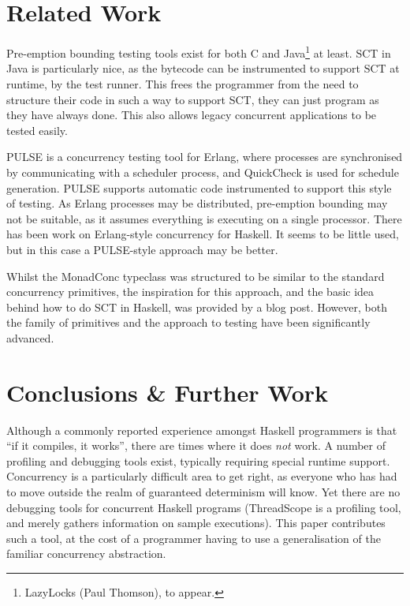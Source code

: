 \section{Related Work}
\label{sec:dejafu-related}

Pre-emption bounding testing tools exist for both C\cite{maple} and
Java\footnote{LazyLocks (Paul Thomson), to appear.} at least. SCT in
Java is particularly nice, as the bytecode can be instrumented to
support SCT at runtime, by the test runner. This frees the programmer
from the need to structure their code in such a way to support SCT,
they can just program as they have always done. This also allows
legacy concurrent applications to be tested easily.

PULSE\cite{pulse} is a concurrency testing tool for Erlang, where
processes are synchronised by communicating with a scheduler process,
and QuickCheck is used for schedule generation.  PULSE supports
automatic code instrumented to support this style of testing. As
Erlang processes may be distributed, pre-emption bounding may not be
suitable, as it assumes everything is executing on a single
processor. There has been work on Erlang-style concurrency for
Haskell\cite{cloudhaskell}. It seems to be little used, but in this
case a PULSE-style approach may be better.

Whilst the MonadConc typeclass was structured to be similar to the
standard concurrency primitives, the inspiration for this approach,
and the basic idea behind how to do SCT in Haskell, was provided by a
blog post\cite{typeclass}. However, both the family of primitives and
the approach to testing have been significantly advanced.

\section{Conclusions \& Further Work}
\label{sec:dejafu-conclusion}

Although a commonly reported experience amongst Haskell programmers is
that ``if it compiles, it works'', there are times where it does
\textit{not} work. A number of profiling and debugging tools exist,
typically requiring special runtime support. Concurrency is a
particularly difficult area to get right, as everyone who has had to
move outside the realm of guaranteed determinism will know. Yet there
are no debugging tools for concurrent Haskell programs
(ThreadScope\cite{threadscope} is a profiling tool, and merely gathers
information on sample executions). This paper contributes such a tool,
at the cost of a programmer having to use a generalisation of the
familiar concurrency abstraction.

